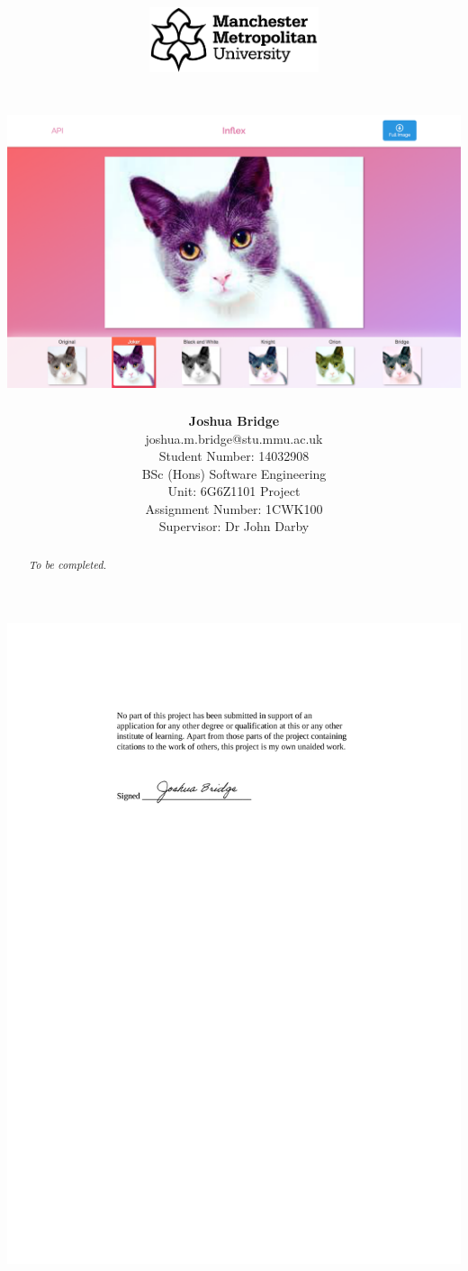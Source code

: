 \documentclass[a4paper,12pt]{report}
\title{\vspace{-3.5cm}\includegraphics[width=5cm]{mmu-white}\\\vspace{2cm}\reportTitle\\\vspace{1cm}\includegraphics[width=0.6\linewidth]{front-end-main}}
\author{\textbf{Joshua Bridge}\\joshua.m.bridge@stu.mmu.ac.uk\\Student Number: 14032908\\\vspace{2cm}BSc (Hons) Software Engineering\\Unit: 6G6Z1101 Project\\Assignment Number: 1CWK100\\Supervisor: Dr John Darby\vspace{1cm}}
\begin{document}
\maketitle

\includegraphics[width=\linewidth]{declaration}

\doublespacing

\begin{abstract}
  \textit{To be completed.}
\end{abstract}

\onehalfspacing

\tableofcontents

\listoffigures

\listoftables

\doublespacing
\end{document}
